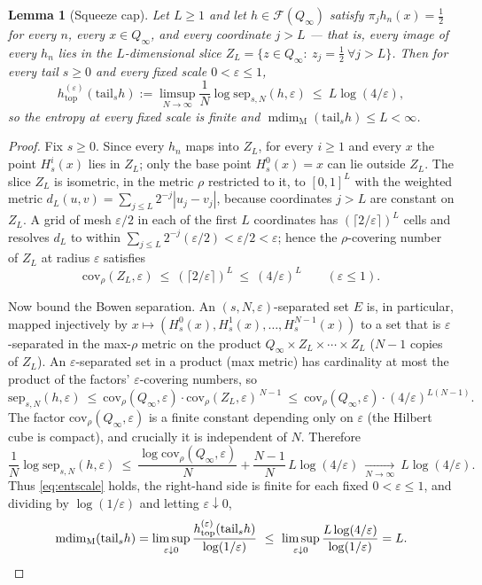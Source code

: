 \documentclass[11pt]{article}
\newtheorem{lemma}[theorem]{Lemma}
\newcommand{\Q}{Q_\infty}
\newcommand{\F}{\mathcal{F}}
\newcommand{\mdim}{\operatorname{mdim}_{\mathrm M}}
\begin{document}
\begin{lemma}[Squeeze cap]\label{lem:cap}
Let $L\ge1$ and let $h\in\F(\Q)$ satisfy $\pi_j h_n(x)=\tfrac12$ for every $n$, every
$x\in\Q$, and every coordinate $j>L$ --- that is, every image of every $h_n$ lies in the
$L$-dimensional slice $Z_L=\{z\in\Q:\ z_j=\tfrac12\ \forall j>L\}$.  Then for every tail
$s\ge0$ and every fixed scale \(0<\varepsilon\le1\),
\begin{equation}\label{eq:entscale}
h_{\mathrm{top}}^{(\varepsilon)}(\mathrm{tail}_sh)
:=\limsup_{N\to\infty}\frac1N\log\mathrm{sep}_{s,N}(h,\varepsilon)
\ \le\ L\log(4/\varepsilon),
\end{equation}
so the entropy at every fixed scale is finite and $\mdim(\mathrm{tail}_sh)\le L<\infty$.
\end{lemma}

\begin{proof}
Fix $s\ge0$.  Since every $h_n$ maps into $Z_L$, for every $i\ge1$ and every $x$ the
point $H^i_s(x)$ lies in $Z_L$; only the base point $H^0_s(x)=x$ can lie outside $Z_L$.
The slice $Z_L$ is isometric, in the metric $\rho$ restricted to it, to $[0,1]^L$ with the
weighted metric $d_L(u,v)=\sum_{j\le L}2^{-j}|u_j-v_j|$, because coordinates $j>L$ are
constant on $Z_L$.  A grid of mesh $\varepsilon/2$ in each of the first $L$ coordinates
has $(\lceil 2/\varepsilon\rceil)^{L}$ cells and resolves $d_L$ to within
$\sum_{j\le L}2^{-j}(\varepsilon/2)<\varepsilon/2<\varepsilon$; hence the $\rho$-covering
number of $Z_L$ at radius $\varepsilon$ satisfies
\[
\mathrm{cov}_\rho(Z_L,\varepsilon)\ \le\ (\lceil 2/\varepsilon\rceil)^{L}\ \le\ (4/\varepsilon)^{L}
\qquad(\varepsilon\le1).
\]

Now bound the Bowen separation.  An $(s,N,\varepsilon)$-separated set $E$ is, in
particular, mapped injectively by $x\mapsto(H^0_s(x),H^1_s(x),\dots,H^{N-1}_s(x))$ to a
set that is $\varepsilon$-separated in the max-$\rho$ metric on the product
$\Q\times Z_L\times\cdots\times Z_L$ ($N-1$ copies of $Z_L$).  An $\varepsilon$-separated
set in a product (max metric) has cardinality at most the product of the factors'
$\varepsilon$-covering numbers, so
\[
\mathrm{sep}_{s,N}(h,\varepsilon)\ \le\ \mathrm{cov}_\rho(\Q,\varepsilon)\cdot
\mathrm{cov}_\rho(Z_L,\varepsilon)^{\,N-1}
\ \le\ \mathrm{cov}_\rho(\Q,\varepsilon)\cdot(4/\varepsilon)^{L(N-1)} .
\]
The factor $\mathrm{cov}_\rho(\Q,\varepsilon)$ is a finite constant depending only on
$\varepsilon$ (the Hilbert cube is compact), and crucially it is independent of $N$.
Therefore
\[
\frac1N\log\mathrm{sep}_{s,N}(h,\varepsilon)
\ \le\ \frac{\log\mathrm{cov}_\rho(\Q,\varepsilon)}{N}
+\frac{N-1}{N}\,L\log(4/\varepsilon)\ \xrightarrow[N\to\infty]{}\ L\log(4/\varepsilon).
\]
Thus \eqref{eq:entscale} holds, the right-hand side is finite for each fixed
\(0<\varepsilon\le1\),
and dividing by $\log(1/\varepsilon)$ and letting $\varepsilon\downarrow0$,
\[
\mdim(\mathrm{tail}_sh)
=\limsup_{\varepsilon\downarrow0}\frac{h^{(\varepsilon)}_{\mathrm{top}}(\mathrm{tail}_sh)}{\log(1/\varepsilon)}
\ \le\ \limsup_{\varepsilon\downarrow0}\frac{L\log(4/\varepsilon)}{\log(1/\varepsilon)}=L. \qedhere
\]
\end{proof}
\end{document}
